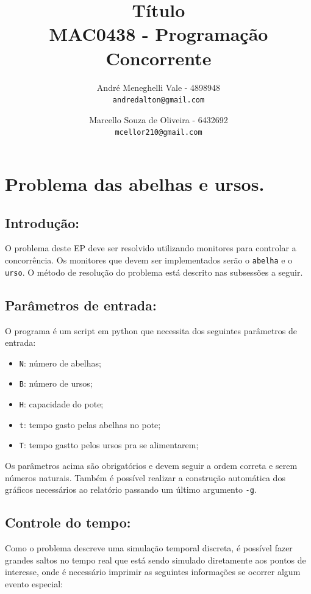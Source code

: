 \documentclass[12pt,a4paper]{article}
\title{Título\\MAC0438 - Programação Concorrente}
\author{
    André Meneghelli Vale - 4898948\\
    \texttt{andredalton@gmail.com}
    \and
    Marcello Souza de Oliveira - 6432692\\
    \texttt{mcellor210@gmail.com}
}
\date{}
\begin{document}
\maketitle

\clearpage

\section{Problema das abelhas e ursos.}

\subsection{Introdução:}

O problema deste EP deve ser resolvido utilizando monitores para controlar a concorrência. Os monitores que devem ser implementados serão o \verb+abelha+ e o \verb+urso+. O método de resolução do problema está descrito nas subsessões a seguir.

\subsection{Parâmetros de entrada:}

O programa é um script em python que necessita dos seguintes parâmetros de entrada:

\begin{itemize}
\item \verb+N+: número de abelhas;
\item \verb+B+: número de ursos;
\item \verb+H+: capacidade do pote;
\item \verb+t+: tempo gasto pelas abelhas no pote;
\item \verb+T+: tempo gastto pelos ursos pra se alimentarem;
\end{itemize}

Os parâmetros acima são obrigatórios e devem seguir a ordem correta e serem números naturais. Também é possível realizar a construção automática dos gráficos necessários ao relatório passando um último argumento \verb+-g+. 

\subsection{Controle do tempo:}

Como o problema descreve uma simulação temporal discreta, é possível fazer grandes saltos no tempo real que está sendo simulado diretamente aos pontos de interesse, onde é necessário imprimir as seguintes informações se ocorrer algum evento especial:
\end{document}
